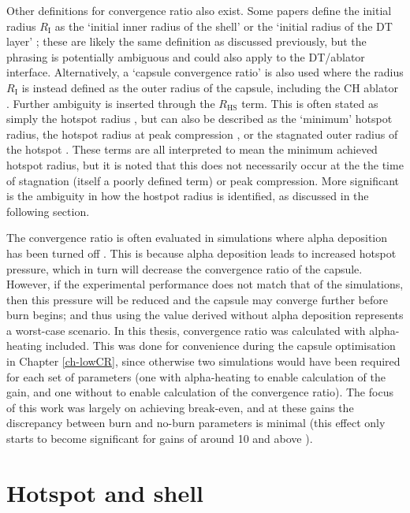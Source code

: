 Other definitions for convergence ratio also exist. Some papers define the initial radius $R_\mathrm{I}$ as the `initial inner radius of the shell' \cite{Craxton2015} or the `initial radius of the DT layer' \cite{Haines2017a}; these are likely the same definition as discussed previously, but the phrasing is potentially ambiguous and could also apply to the DT/ablator interface. Alternatively, a `capsule convergence ratio' is also used where the radius $R_\mathrm{I}$ is instead defined as the outer radius of the capsule, including the CH ablator \cite{Lindl2004}. Further ambiguity is inserted through the $R_\mathrm{HS}$ term. This is often stated as simply the hotspot radius \cite{Olson2016, Olson2021}, but can also be described as the `minimum' hotspot radius, the hotspot radius at peak compression \cite{Craxton2015}, or the stagnated outer radius of the hotspot \cite{Zylstra2018}. These terms are all interpreted to mean the minimum achieved hotspot radius, but it is noted that this does not necessarily occur at the the time of stagnation (itself a poorly defined term) or peak compression. More significant is the ambiguity in how the hostpot radius is identified, as discussed in the following section.

The convergence ratio is often evaluated in simulations where alpha deposition has been turned off \cite{Craxton2015}. This is because alpha deposition leads to increased hotspot pressure, which in turn will decrease the convergence ratio of the capsule. However, if the experimental performance does not match that of the simulations, then this pressure will be reduced and the capsule may converge further before burn begins; and thus using the value derived without alpha deposition represents a worst-case scenario. In this thesis, convergence ratio was calculated with alpha-heating included. This was done for convenience during the capsule optimisation in Chapter \ref{ch-lowCR}, since otherwise two simulations would have been required for each set of parameters (one with alpha-heating to enable calculation of the gain, and one without to enable calculation of the convergence ratio). The focus of this work was largely on achieving break-even, and at these gains the discrepancy between burn and no-burn parameters is minimal (this effect only starts to become significant for gains of around 10 and above \cite{GoncharovPersonalComm}).

\section{Hotspot and shell}

